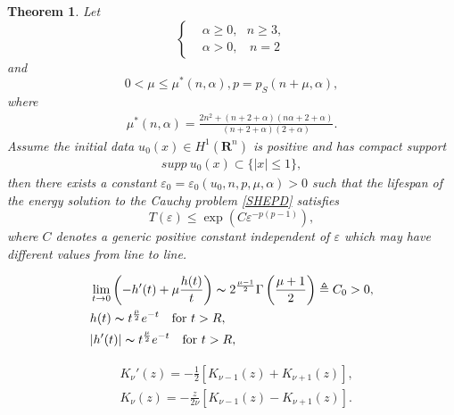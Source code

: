 \documentclass[10pt,a4paper]{amsart}
\newtheorem{thm}{Theorem}
\newcommand{\R}{\mathbf{R}}
\newcommand{\e}{\varepsilon}
\begin{document}
\begin{thm}
\label{hddamped}
Let
\begin{equation}
\label{al}
\left\{
\begin{aligned}
& \alpha\ge 0,~~~n\ge 3,\\
& \alpha>0,~~~~n=2
\end{aligned}
\right.
\end{equation}
and
\[
0<\mu\leq\mu^*(n,\alpha), p=p_S(n+\mu, \alpha),
\]
 where
\begin{equation}
\begin{aligned}
\mu^*(n,\alpha)=\frac{2n^2+(n+2+\alpha)(n\alpha+2+\alpha)}{(n+2+\alpha)(2+\alpha)}.
\end{aligned}
\end{equation}
Assume the initial data $u_0(x)\in H^1(\R^n)$ is positive and has compact support
\begin{equation}
\begin{aligned}
supp~u_0(x)\subset\{|x|\le 1\},
\end{aligned}
\end{equation}
then there exists a constant $\e_0=\e_0(u_0,n,p,\mu,\alpha)>0$ such that the lifespan of the energy solution to the Cauchy problem \eqref{SHEPD} satisfies
\begin{equation}
\label{lf2}
T(\e)\le \exp\left(C\e^{-p(p-1)}\right),
\end{equation}
where $C$ denotes a generic positive constant independent of $\e$ which may have different values from line to line.
\end{thm}

\begin{equation}\label{beode}
\begin{aligned}
& \lim_{t\rightarrow 0}\left(-h'(t)+\mu\frac{h(t)}{t}\right)\thicksim 2^{\frac{\mu-1}{2}}\Gamma\left(\frac{\mu+1}{2}\right)\triangleq C_0>0,\\
&h(t)\thicksim t^{\frac{\mu}2}e^{-t}\quad\mbox{for}\ t>R,\\
&|h'(t)|\thicksim t^{\frac{\mu}2}e^{-t}\quad\mbox{for}\ t>R,\\
\end{aligned}
\end{equation}

\begin{equation}\label{rela}
\begin{aligned}
&K_\nu'(z)=-\frac12\left[K_{\nu-1}(z)+K_{\nu+1}(z)\right],\\
&K_\nu(z)=-\frac{z}{2\nu}\left[K_{\nu-1}(z)-K_{\nu+1}(z)\right].\\
\end{aligned}
\end{equation}
\end{document}
